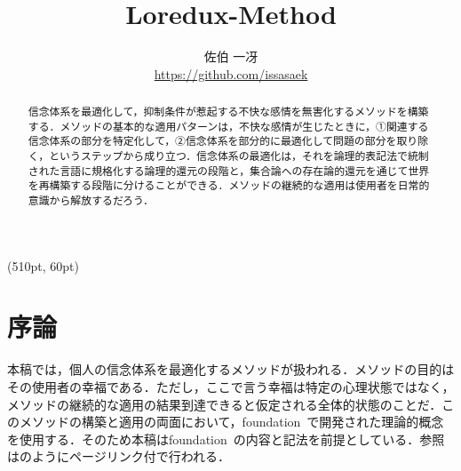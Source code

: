 
\begin{textblock*}{0.1\linewidth}(510pt, 60pt)
    \small \version
\end{textblock*}

\title{Loredux-Method}
\author{佐伯 一冴\\\small\url{https://github.com/issasaek}}
\date{}
\maketitle

\begin{abstract}
    信念体系を最適化して，抑制条件が惹起する不快な感情を無害化するメソッドを構築する．メソッドの基本的な適用パターンは，不快な感情が生じたときに，①関連する信念体系の部分を特定化して，②信念体系を部分的に最適化して問題の部分を取り除く，というステップから成り立つ．信念体系の最適化は，それを論理的表記法で統制された言語に規格化する論理的還元の段階と，集合論への存在論的還元を通じて世界を再構築する段階に分けることができる．メソッドの継続的な適用は使用者を日常的意識から解放するだろう．
\end{abstract}

\section{序論}
\label{sec:序論}

本稿では，個人の信念体系を最適化するメソッドが扱われる．メソッドの目的はその使用者の幸福である．ただし，ここで言う幸福は特定の心理状態ではなく，メソッドの継続的な適用の結果到達できると仮定される全体的状態のことだ．このメソッドの構築と適用の両面において，foundation~\cite{foundation}で開発された理論的概念を使用する．そのため本稿はfoundation~\cite{foundation}の内容と記法を前提としている．参照はのようにページリンク付で行われる．

